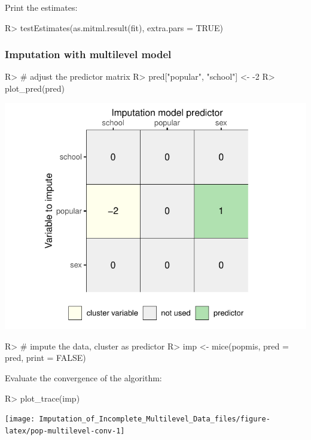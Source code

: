 \documentclass[
]{jss}
\begin{document}
Print the estimates:

\begin{CodeChunk}
\begin{CodeInput}
R> testEstimates(as.mitml.result(fit), extra.pars = TRUE)
\end{CodeInput}
\end{CodeChunk}

\hypertarget{imputation-with-multilevel-model}{%
\subsubsection{Imputation with multilevel
model}\label{imputation-with-multilevel-model}}

\begin{CodeChunk}
\begin{CodeInput}
R> # adjust the predictor matrix
R> pred["popular", "school"] <- -2 
R> plot_pred(pred)
\end{CodeInput}


\begin{center}\includegraphics{Imputation_of_Incomplete_Multilevel_Data_files/figure-latex/pop_multilevel-1} \end{center}

\begin{CodeInput}
R> # impute the data, cluster as predictor
R> imp <- mice(popmis, pred = pred, print = FALSE)
\end{CodeInput}
\end{CodeChunk}

Evaluate the convergence of the algorithm:

\begin{CodeChunk}
\begin{CodeInput}
R> plot_trace(imp)
\end{CodeInput}


\begin{center}\texttt{[image: Imputation\_of\_Incomplete\_Multilevel\_Data\_files/figure-latex/pop-multilevel-conv-1]} \end{center}

\end{CodeChunk}
\end{document}
